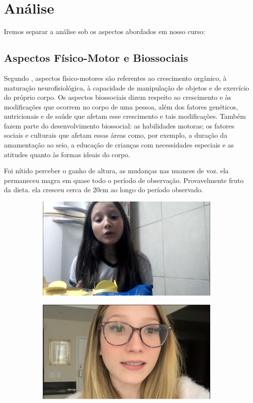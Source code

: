 \section{Análise}

Iremos separar a análise sob os aspectos abordados em nosso curso:

\subsection{Aspectos Físico-Motor e Biossociais}

Segundo , aspectos físico-motores são referentes ao crescimento orgânico, à maturação neurofisiológica, à capacidade de manipulação de objetos e de exercício do próprio corpo.
Os aspectos biossociais dizem respeito ao crescimento e às modificações que ocorrem no corpo de uma pessoa, além dos fatores genéticos, nutricionais e de saúde que afetam esse crescimento e tais modificações. Também fazem parte do desenvolvimento biossocial: as habilidades motoras; os fatores sociais e culturais que afetam essas áreas como, por exemplo, a duração da amamentação ao seio, a educação de crianças com necessidades especiais e as atitudes quanto às formas ideais do corpo.

Foi nítido perceber o ganho de altura, as mudanças nas nuances de voz. ela permaneceu magra em quase todo o período de observação. Provavelmente fruto da dieta. ela cresceu cerca de 20cm ao longo do período observado.


\begin{figure}[h!]
    \centering

    \begin{subfigure}{.5\textwidth}
        \includegraphics[width=0.4\linewidth]{fig/Zabetta-13-anos-primeiro-video}
    \end{subfigure}%

    \begin{subfigure}{.5\textwidth}
        \includegraphics[width=0.4\linewidth]{fig/Zabetta-18-anos-facul}
    \end{subfigure}%

\end{figure}



